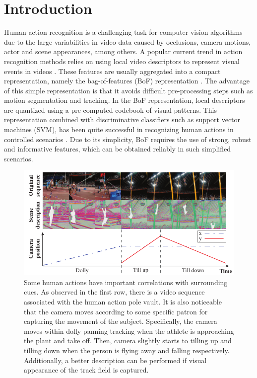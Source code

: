 \documentclass[runningheads]{llncs}
\begin{document}
\section{Introduction} \label{introduction}

Human action recognition is a challenging task for computer vision algorithms due to the large variabilities in video data caused by occlusions, camera motions, actor and scene appearances, among others. A popular current trend in action recognition methods relies on using local video descriptors to represent visual events in videos \cite{laptev2005, dollar2005, wang2011}. These features are usually aggregated into a compact representation, namely the bag-of-features (BoF) representation \cite{laptev2008}. The advantage of this simple representation is that it avoids difficult pre-processing steps such as motion segmentation and tracking. In the BoF representation, local descriptors are quantized using a pre-computed codebook of visual patterns. This representation combined with discriminative classifiers such as support vector machines (SVM), has been quite successful in recognizing human actions  in controlled scenarios \cite{blank2005, schuldt2004}. Due to its simplicity, BoF requires the use of strong, robust and informative features, which can be obtained reliably in such simplified scenarios.

\begin{figure}[ht]
\begin{center}
\includegraphics[width=0.98\linewidth]{pull_figure.pdf}
\end{center}
\caption{Some human actions have important correlations with surrounding cues. As observed in the first row, there is a video sequence associated with the human action pole vault. It is also noticeable that the camera moves according to some specific patron for capturing the movement of the subject. Specifically, the camera moves within dolly panning tracking when the athlete is approaching the plant and take off. Then, camera slightly starts to tilling up and tilling down when the person is flying away and falling respectively. Additionally, a better description can be performed if visual appearance of the track field is captured.}
\label{fig:pull_figure}
\end{figure}
\end{document}
